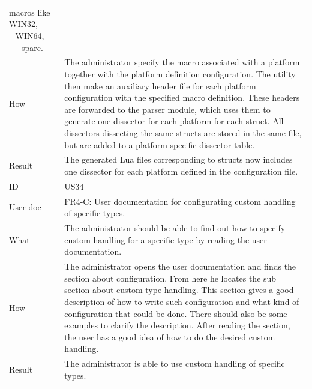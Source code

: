 \begin{table}[htbp]
{\begin{tabularx}{1.2\textwidth}{l X}
	macros like WIN32, \_WIN64, \_\_sparc. \\
	How & The administrator specify the macro associated with a platform together with the platform definition configuration. The utility then make an auxiliary header file for each 
	platform configuration with the specified macro definition. These headers are forwarded to the parser module, which uses them to generate
  	one dissector for each platform for each struct. All dissectors dissecting the same structs are stored in the same file, but are added to a platform specific dissector table. \\
	Result & The generated Lua files corresponding to structs now includes one dissector for each platform defined in the configuration file. \\
	\midrule
	ID & US34 \\
	User doc & FR4-C: User documentation for configurating custom handling of specific types. \\
	What & The administrator should be able to find out how to specify custom handling for a specific type by reading the user documentation. \\
	How &	 The administrator opens the user documentation and finds the section about configuration. From here he locates the sub section about custom type handling. 
	This section gives a good description of how to write such configuration and what kind of configuration that could be done. There should also be some examples to clarify
	the description. After reading the section, the user has a good idea of how to do the desired custom handling. \\ 
	Result & The administrator is able to use custom handling of specific types. \\
	\midrule

\end{tabularx}}
\end{table}

